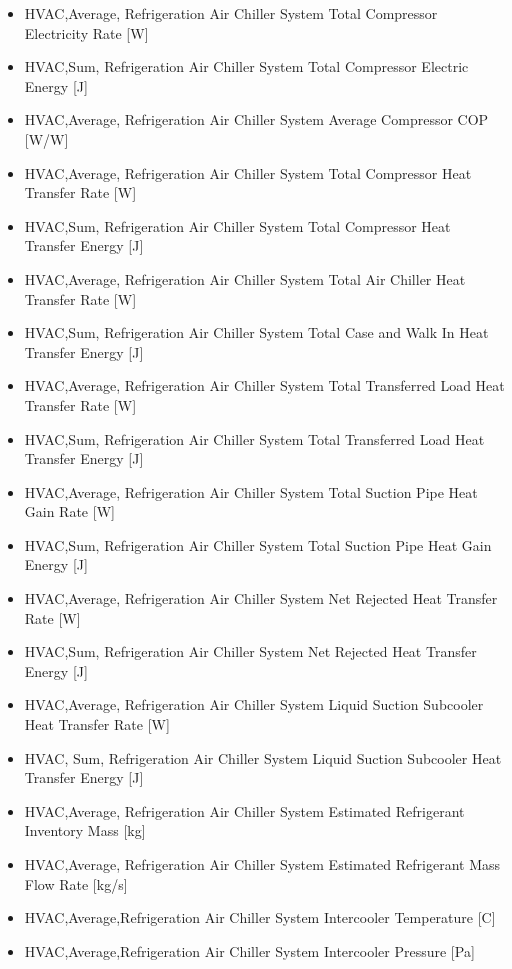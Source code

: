 \begin{itemize}
\item
  HVAC,Average, Refrigeration Air Chiller System Total Compressor Electricity Rate {[}W{]}
\item
  HVAC,Sum, Refrigeration Air Chiller System Total Compressor Electric Energy {[}J{]}
\item
  HVAC,Average, Refrigeration Air Chiller System Average Compressor COP {[}W/W{]}
\item
  HVAC,Average, Refrigeration Air Chiller System Total Compressor Heat Transfer Rate {[}W{]}
\item
  HVAC,Sum, Refrigeration Air Chiller System Total Compressor Heat Transfer Energy {[}J{]}
\item
  HVAC,Average, Refrigeration Air Chiller System Total Air Chiller Heat Transfer Rate {[}W{]}
\item
  HVAC,Sum, Refrigeration Air Chiller System Total Case and Walk In Heat Transfer Energy {[}J{]}
\item
  HVAC,Average, Refrigeration Air Chiller System Total Transferred Load Heat Transfer Rate {[}W{]}
\item
  HVAC,Sum, Refrigeration Air Chiller System Total Transferred Load Heat Transfer Energy {[}J{]}
\item
  HVAC,Average, Refrigeration Air Chiller System Total Suction Pipe Heat Gain Rate {[}W{]}
\item
  HVAC,Sum, Refrigeration Air Chiller System Total Suction Pipe Heat Gain Energy {[}J{]}
\item
  HVAC,Average, Refrigeration Air Chiller System Net Rejected Heat Transfer Rate {[}W{]}
\item
  HVAC,Sum, Refrigeration Air Chiller System Net Rejected Heat Transfer Energy {[}J{]}
\item
  HVAC,Average, Refrigeration Air Chiller System Liquid Suction Subcooler Heat Transfer Rate {[}W{]}
\item
  HVAC, Sum, Refrigeration Air Chiller System Liquid Suction Subcooler Heat Transfer Energy {[}J{]}
\item
  HVAC,Average, Refrigeration Air Chiller System Estimated Refrigerant Inventory Mass {[}kg{]}
\item
  HVAC,Average, Refrigeration Air Chiller System Estimated Refrigerant Mass Flow Rate {[}kg/s{]}
\item
  HVAC,Average,Refrigeration Air Chiller System Intercooler Temperature {[}C{]}
\item
  HVAC,Average,Refrigeration Air Chiller System Intercooler Pressure {[}Pa{]}

\end{itemize}
